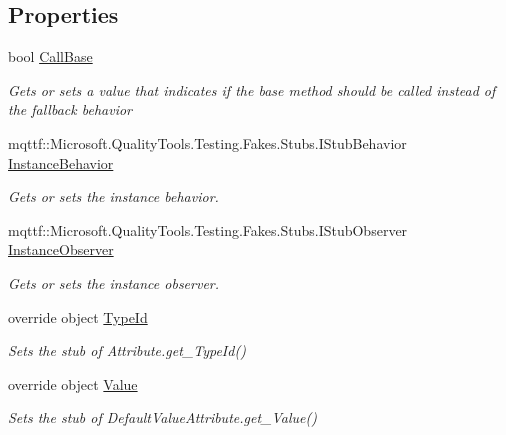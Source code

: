 \subsection*{Properties}
\begin{DoxyCompactItemize}
\item 
bool \hyperlink{class_system_1_1_component_model_1_1_fakes_1_1_stub_default_value_attribute_ac3af208d38732ceece3eb1fc4e20eb85}{Call\-Base}
\begin{DoxyCompactList}\small\item\em Gets or sets a value that indicates if the base method should be called instead of the fallback behavior\end{DoxyCompactList}\item 
mqttf\-::\-Microsoft.\-Quality\-Tools.\-Testing.\-Fakes.\-Stubs.\-I\-Stub\-Behavior \hyperlink{class_system_1_1_component_model_1_1_fakes_1_1_stub_default_value_attribute_a9a37c6c63aa5562a689e4ed3cbbaaf03}{Instance\-Behavior}
\begin{DoxyCompactList}\small\item\em Gets or sets the instance behavior.\end{DoxyCompactList}\item 
mqttf\-::\-Microsoft.\-Quality\-Tools.\-Testing.\-Fakes.\-Stubs.\-I\-Stub\-Observer \hyperlink{class_system_1_1_component_model_1_1_fakes_1_1_stub_default_value_attribute_aecd318eb3267f24e533ae5596f05e0dd}{Instance\-Observer}
\begin{DoxyCompactList}\small\item\em Gets or sets the instance observer.\end{DoxyCompactList}\item 
override object \hyperlink{class_system_1_1_component_model_1_1_fakes_1_1_stub_default_value_attribute_a31f73d3ed4fa1cd638fe68c8cd45f045}{Type\-Id}
\begin{DoxyCompactList}\small\item\em Sets the stub of Attribute.\-get\-\_\-\-Type\-Id()\end{DoxyCompactList}\item 
override object \hyperlink{class_system_1_1_component_model_1_1_fakes_1_1_stub_default_value_attribute_a44bced2687d9bafef60cddee9a7e6930}{Value}
\begin{DoxyCompactList}\small\item\em Sets the stub of Default\-Value\-Attribute.\-get\-\_\-\-Value()\end{DoxyCompactList}\end{DoxyCompactItemize}


